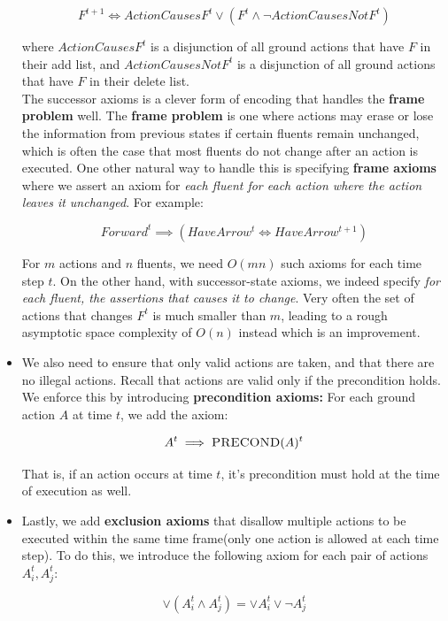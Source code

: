 \documentclass[11pt]{article}
\begin{document}
\begin{itemize}
    $$
    F^{t+1} \iff ActionCausesF^t \lor (F^t \land \lnot ActionCausesNotF^t)
    $$
    
    where $ActionCausesF^t$ is a disjunction of all ground actions that have $F$ in their add list, and $ActionCausesNotF^t$ is a disjunction of all ground actions that have $F$ in their delete list.\\
    
    The successor axioms is a clever form of encoding that handles the \textbf{frame problem} well. The \textbf{frame problem} is one where actions may erase or lose the information from previous states if certain fluents remain unchanged, which is often the case that most fluents do not change after an action is executed. One other natural way to handle this is specifying \textbf{frame axioms} where we assert an axiom for \textit{each fluent for each action where the action leaves it unchanged}. For example:
    
    $$
    Forward^t \implies (HaveArrow^t \iff HaveArrow^{t+1})
    $$
    
    For $m$ actions and $n$ fluents, we need $O(mn)$ such axioms for each time step $t$. On the other hand, with successor-state axioms, we indeed specify \textit{for each fluent, the assertions that causes it to change}. Very often the set of actions that changes $F^t$ is much smaller than $m$, leading to a rough asymptotic space complexity of $O(n)$ instead which is an improvement.
    
    \item We also need to ensure that only valid actions are taken, and that there are no illegal actions. Recall that actions are valid only if the precondition holds. We enforce this by introducing \textbf{precondition axioms:} For each ground action $A$ at time $t$, we add the axiom:
    
    $$
    A^t \implies \textsc{PRECOND}(A)^t
    $$
    
    That is, if an action occurs at time $t$, it's precondition must hold at the time of execution as well.
    
    \item Lastly, we add \textbf{exclusion axioms} that disallow multiple actions to be executed within the same time frame(only one action is allowed at each time step). To do this, we introduce the following axiom for each pair of actions $A^t_i, A^t_j$:
    
    $$
    \lor (A^t_i \land A^t_j) = \lor A^t_i \lor \lnot A^t_j
    $$
    
\end{itemize}
\end{document}
